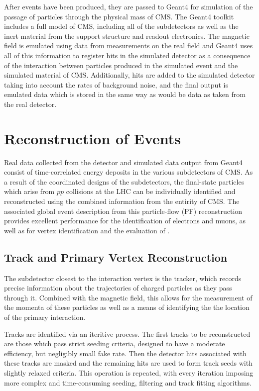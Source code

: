  After events have been produced,
  they are passed to Geant4 
  for simulation of the passage of particles
  through the physical mass of CMS.
 The Geant4 toolkit includes a full
  model of CMS, including 
  all of the subdetectors as well as the
  inert material from the support structure
  and readout electronics.
 The magnetic field is emulated using
  data from measurements on the real field
  and Geant4 uses all of this information
  to register hits in the simulated
  detector as a consequence of the interaction
  between particles produced in the simulated
  event and the simulated material of CMS.
 Additionally, hits are added to the
  simulated detector taking into account
  the rates of background noise, and the
  final output is emulated data
  which is stored in the same way
  as would be data as taken from the real detector.



\section{Reconstruction of Events}\label{sec:reconstruction}

 Real data collected from the detector
  and simulated data output from Geant4
  consist of time-correlated energy deposits
  in the various subdetectors of CMS.
 As a result of the coordinated designs 
  of the subdetectors, the final-state 
  particles which arise from $pp$ collisions 
  at the LHC can be individually identified
  and reconstructed using the combined
  information from the entirity of CMS.
 The associated global event description
  from this particle-flow (PF) reconstruction
  provides excellent performance for
  the identification of electrons and muons,
  as well as for vertex identification
  and the evaluation of \met.
 
\subsection{Track and Primary Vertex Reconstruction}
 The subdetector closest to the interaction vertex
  is the tracker, which records precise
  information about the trajectories of 
  charged particles as they pass through it.
 Combined with the magnetic field, 
  this allows for the measurement of the
  momenta of these particles as well as a
  means of identifying the the location of
  the primary interaction.

 Tracks are identified via an iteritive process. 
 The first tracks to be reconstructed
  are those which pass strict seeding
  criteria, designed to have a moderate
  efficiency, but negligibly small
  fake rate.
 Then the detector hits associated
  with these tracks are masked
  and the remaining hits are used to
  form track seeds with slightly relaxed
  criteria.
 This operation is repeated, with every
  iteration imposing more complex and time-consuming
  seeding, filtering and track fitting algorithms.
 
